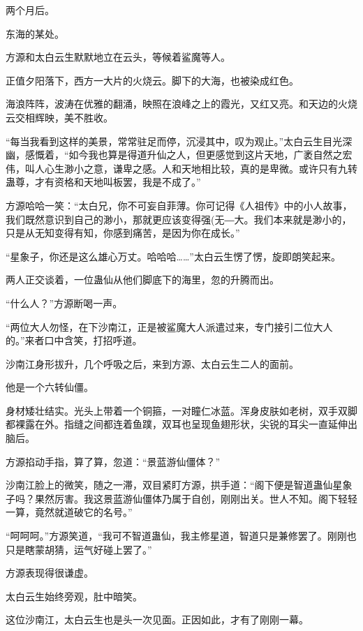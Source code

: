 
\begin{this_body}

两个月后。

东海的某处。

方源和太白云生默默地立在云头，等候着鲨魔等人。

正值夕阳落下，西方一大片的火烧云。脚下的大海，也被染成红色。

海浪阵阵，波涛在优雅的翻涌，映照在浪峰之上的霞光，又红又亮。和天边的火烧云交相辉映，美不胜收。

“每当我看到这样的美景，常常驻足而停，沉浸其中，叹为观止。”太白云生目光深幽，感慨着，“如今我也算是得道升仙之人，但更感觉到这片天地，广袤自然之宏伟，叫人心生渺小之意，谦卑之感。人和天地相比较，真的是卑微。或许只有九转蛊尊，才有资格和天地叫板罢，我是不成了。”

方源哈哈一笑：“太白兄，你不可妄自菲薄。你可记得《人祖传》中的小人故事，我们既然意识到自己的渺小，那就更应该变得强(无―大。我们本来就是渺小的，只是从无知变得有知，你感到痛苦，是因为你在成长。”

“星象子，你还是这么雄心万丈。哈哈哈……”太白云生愣了愣，旋即朗笑起来。

两人正交谈着，一位蛊仙从他们脚底下的海里，忽的升腾而出。

“什么人？”方源断喝一声。

“两位大人勿怪，在下沙南江，正是被鲨魔大人派遣过来，专门接引二位大人的。”来者口中含笑，打招呼道。

沙南江身形拔升，几个呼吸之后，来到方源、太白云生二人的面前。

他是一个六转仙僵。

身材矮壮结实。光头上带着一个铜箍，一对瞳仁冰蓝。浑身皮肤如老树，双手双脚都裸露在外。指缝之间都连着鱼蹼，双耳也呈现鱼翅形状，尖锐的耳尖一直延伸出脑后。

方源掐动手指，算了算，忽道：“景蓝游仙僵体？”

沙南江脸上的微笑，随之一滞，双目紧盯方源，拱手道：“阁下便是智道蛊仙星象子吗？果然厉害。我这景蓝游仙僵体乃属于自创，刚刚出关。世人不知。阁下轻轻一算，竟然就道破它的名号。”

“呵呵呵。”方源笑道，“我可不智道蛊仙，我主修星道，智道只是兼修罢了。刚刚也只是瞎蒙胡猜，运气好碰上罢了。”

方源表现得很谦虚。

太白云生始终旁观，肚中暗笑。

这位沙南江，太白云生也是头一次见面。正因如此，才有了刚刚一幕。


\end{this_body}
